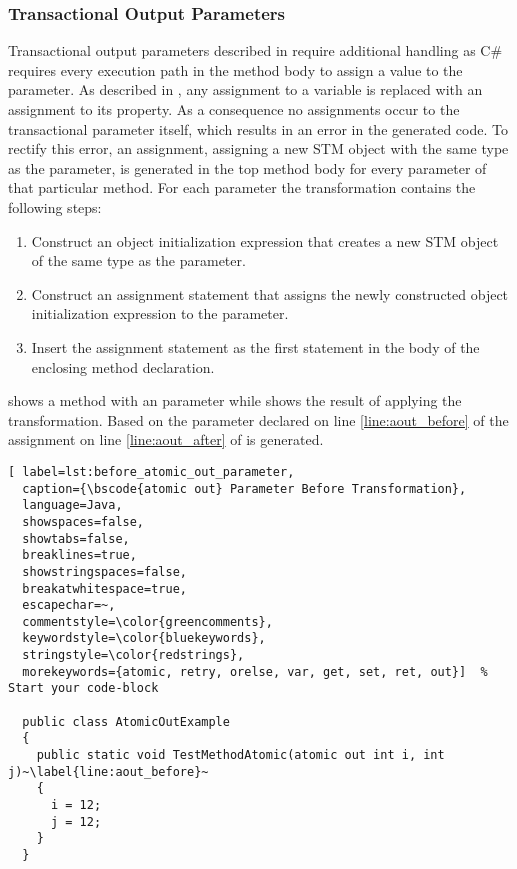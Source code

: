 \subsubsection{Transactional Output Parameters}
Transactional output parameters described in  require additional handling as C\# requires every execution path in the method body to assign a value to the parameter\cite[p. 42]{sestoft2011c}. As described in , any assignment to a variable is replaced with an assignment to its  property. As a consequence no assignments occur to the transactional parameter itself, which results in an error in the generated code. To rectify this error, an assignment, assigning a new \ac{STM} object with the same type as the parameter, is generated in the top method body for every  parameter of that particular method. For each  parameter the \stmnamesp transformation contains the following steps:

\begin{enumerate}
	\item Construct an object initialization expression that creates a new \ac{STM} object of the same type as the parameter.
	\item Construct an assignment statement that assigns the newly constructed object initialization expression to the  parameter.
	\item Insert the assignment statement as the first statement in the body of the enclosing method declaration.
\end{enumerate}

 shows a method with an  parameter while  shows the result of applying the transformation.
Based on the  parameter declared on line \ref{line:aout_before} of  the assignment on line \ref{line:aout_after} of  is generated.


\begin{lstlisting}[ label=lst:before_atomic_out_parameter,
  caption={\bscode{atomic out} Parameter Before Transformation},
  language=Java,  
  showspaces=false,
  showtabs=false,
  breaklines=true,
  showstringspaces=false,
  breakatwhitespace=true,
  escapechar=~,
  commentstyle=\color{greencomments},
  keywordstyle=\color{bluekeywords},
  stringstyle=\color{redstrings},
  morekeywords={atomic, retry, orelse, var, get, set, ret, out}]  % Start your code-block

  public class AtomicOutExample
  {
    public static void TestMethodAtomic(atomic out int i, int j)~\label{line:aout_before}~
    {
      i = 12;
      j = 12;
    }
  }
\end{lstlisting}

